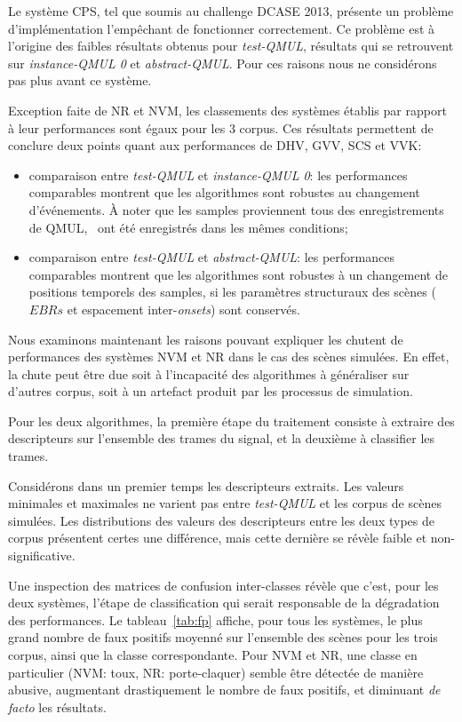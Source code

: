 Le système CPS, tel que soumis au challenge DCASE 2013, présente un problème d'implémentation l'empêchant de fonctionner correctement. Ce problème est à l'origine des faibles résultats obtenus pour \emph{test-QMUL}, résultats qui se retrouvent sur \emph{instance-QMUL 0} et \emph{abstract-QMUL}. Pour ces raisons nous ne considérons pas plus avant ce système.

Exception faite de NR et NVM, les classements des systèmes établis par rapport à leur performances sont égaux pour les 3 corpus. Ces résultats permettent de conclure deux points quant aux performances de DHV, GVV, SCS et VVK:

\begin{itemize}
\item comparaison entre \emph{test-QMUL} et \emph{instance-QMUL 0}: les performances comparables montrent que les algorithmes sont robustes au changement d'événements. À noter que les samples proviennent tous des enregistrements de QMUL, \ie~ont été enregistrés dans les mêmes conditions;
\item comparaison entre \emph{test-QMUL} et \emph{abstract-QMUL}: les performances comparables montrent que les algorithmes sont robustes à un changement de positions temporels des samples, si les paramètres structuraux des scènes ($EBRs$ et espacement inter-\emph{onsets}) sont conservés.
\end{itemize}
  
Nous examinons maintenant les raisons pouvant expliquer les chutent de performances des systèmes NVM et NR dans le cas des scènes simulées. En effet, la chute peut être due soit à l'incapacité des algorithmes à généraliser sur d'autres corpus, soit à un artefact produit par les processus de simulation.

Pour les deux algorithmes, la première étape du traitement consiste à extraire des descripteurs sur l'ensemble des trames du signal, et la deuxième à classifier les trames.

Considérons dans un premier temps les descripteurs extraits. Les valeurs minimales et maximales ne varient pas entre \emph{test-QMUL} et les corpus de scènes simulées. Les distributions des valeurs des descripteurs entre les deux types de corpus présentent certes une différence, mais cette dernière se révèle faible et non-significative.  

Une inspection des matrices de confusion inter-classes révèle que c'est, pour les deux systèmes, l'étape de classification qui serait responsable de la dégradation des performances. Le tableau~\ref{tab:fp} affiche, pour tous les systèmes, le plus grand nombre de faux positifs moyenné sur l'ensemble des scènes pour les trois corpus, ainsi que la classe correspondante. Pour NVM et NR, une classe en particulier (NVM: toux, NR: porte-claquer) semble être détectée de manière abusive, augmentant drastiquement le nombre de faux positifs, et diminuant \emph{de facto} les résultats.

